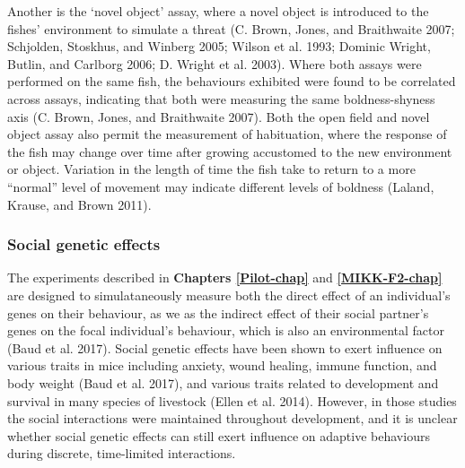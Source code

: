 \documentclass[
]{book}
\begin{document}
Another is the `novel object' assay, where a novel object is introduced to the fishes' environment to simulate a threat (C. Brown, Jones, and Braithwaite 2007; Schjolden, Stoskhus, and Winberg 2005; Wilson et al. 1993; Dominic Wright, Butlin, and Carlborg 2006; D. Wright et al. 2003). Where both assays were performed on the same fish, the behaviours exhibited were found to be correlated across assays, indicating that both were measuring the same boldness-shyness axis (C. Brown, Jones, and Braithwaite 2007). Both the open field and novel object assay also permit the measurement of habituation, where the response of the fish may change over time after growing accustomed to the new environment or object. Variation in the length of time the fish take to return to a more ``normal'' level of movement may indicate different levels of boldness (Laland, Krause, and Brown 2011).

\hypertarget{social-genetic-effects}{%
\subsubsection{Social genetic effects}\label{social-genetic-effects}}

The experiments described in \textbf{Chapters \ref{Pilot-chap}} and \textbf{\ref{MIKK-F2-chap}} are designed to simulataneously measure both the direct effect of an individual's genes on their behaviour, as we as the indirect effect of their social partner's genes on the focal individual's behaviour, which is also an environmental factor (Baud et al. 2017). Social genetic effects have been shown to exert influence on various traits in mice including anxiety, wound healing, immune function, and body weight (Baud et al. 2017), and various traits related to development and survival in many species of livestock (Ellen et al. 2014). However, in those studies the social interactions were maintained throughout development, and it is unclear whether social genetic effects can still exert influence on adaptive behaviours during discrete, time-limited interactions.
\end{document}
